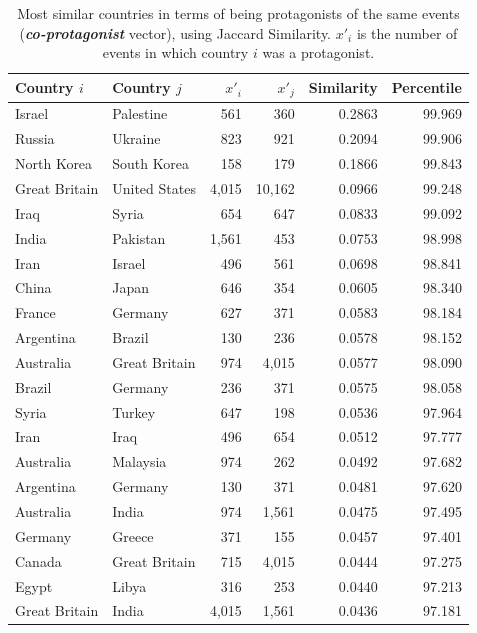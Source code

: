 \begin{table}
  \centering
  \footnotesize
\begin{tabular}{llrrrr}
\toprule
Country $i$ & Country $j$ & $x'_i$ & $x'_j$ & Similarity & Percentile\\
\midrule
Israel & Palestine & 561 & 360 & 0.2863 & 99.969\\
Russia & Ukraine & 823 & 921 & 0.2094 & 99.906\\
North Korea & South Korea & 158 & 179 & 0.1866 & 99.843 \\
Great Britain & United States & 4,015 & 10,162 & 0.0966 & 99.248\\
Iraq & Syria & 654 & 647 & 0.0833 & 99.092\\
\addlinespace
India & Pakistan & 1,561 & 453 & 0.0753 & 98.998\\
Iran & Israel & 496 & 561 & 0.0698 & 98.841\\
China & Japan & 646 & 354 & 0.0605 & 98.340\\
France & Germany & 627 & 371 & 0.0583 & 98.184\\
\addlinespace
Argentina & Brazil & 130 & 236 & 0.0578 & 98.152\\
Australia & Great Britain & 974 & 4,015 & 0.0577 & 98.090\\
Brazil & Germany & 236 & 371 & 0.0575 & 98.058\\
Syria & Turkey & 647 & 198 & 0.0536 & 97.964\\
\addlinespace
Iran & Iraq & 496 & 654 & 0.0512 & 97.777\\
Australia & Malaysia & 974 & 262 & 0.0492 & 97.682\\
Argentina & Germany & 130 & 371 & 0.0481 & 97.620\\
Australia & India & 974 & 1,561 & 0.0475 & 97.495\\
\addlinespace
Germany & Greece & 371 & 155 & 0.0457 & 97.401\\
Canada & Great Britain & 715 & 4,015 & 0.0444 & 97.275\\
Egypt & Libya & 316 & 253 & 0.0440 & 97.213\\
Great Britain & India & 4,015 & 1,561 & 0.0436 & 97.181\\
\bottomrule
\end{tabular}
\caption[Most similar countries in terms of being protagonists of the same events]{Most similar
countries in terms of being protagonists of the same events
(\emph{\textbf{co-protagonist}} vector), using Jaccard Similarity. $x'_i$ is the
number of events in which country $i$ was a protagonist.}\label{tab:jacc}
\end{table}

